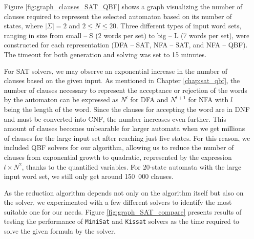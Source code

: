 Figure \ref{fig:graph_clauses_SAT_QBF} shows a graph visualizing the number of clauses required to represent the selected automaton based on its number of states, where $|\Sigma|=2$ and $ 2 \leq N \leq 20$. Three different types of input word sets, ranging in size from small -- S (2 words per set) to big -- L (7 words per set), were constructed for each representation (DFA -- SAT, \linebreak NFA -- SAT, and NFA -- QBF). The timeout for both generation and solving was set to 15 minutes.

For SAT solvers, we may observe an exponential increase in the number of clauses based on the given input. As mentioned in Chapter \ref{chap:sat_qbf}, the number of clauses necessary to represent the acceptance or rejection of the words by the automaton can be expressed as $N^l$ for DFA and $N^{l+1}$ for NFA with $l$ being the length of the word. Since the clauses for accepting the word are in DNF and must be converted into CNF, the number increases even further. This amount of clauses becomes unbearable for larger automata when we get millions of clauses for the large input set after reaching just five states. For this reason, we included QBF solvers for our algorithm, allowing us to reduce the number of clauses from exponential growth to quadratic, represented by the expression ${l \times N^2}$, thanks to the quantified variables. For 20-state automata with the large input word set, we still only get around 150\ 000 clauses.

\vspace{0.3cm}

As the reduction algorithm depends not only on the algorithm itself but also on the solver, we experimented with a few different solvers to identify the most suitable one for our needs. Figure \ref{fig:graph_SAT_compare} presents results of testing the performance of \texttt{MiniSat} and \texttt{Kissat} solvers as the time required to solve the given formula by the solver.

